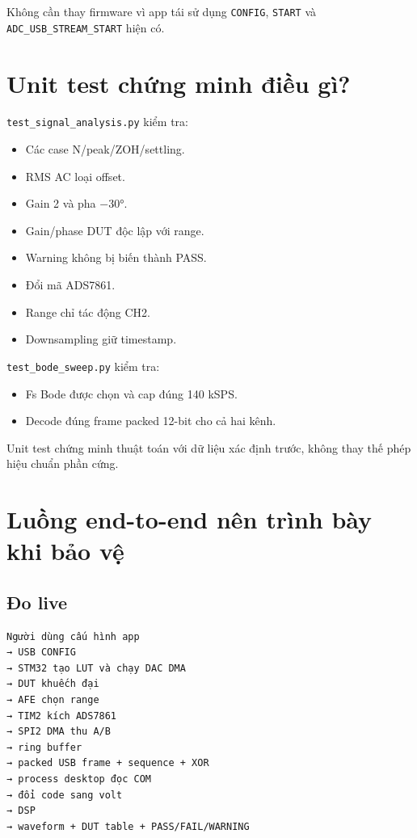\documentclass[12pt,a4paper,oneside]{article}
\newcommand{\inlinecode}[1]{\texttt{#1}}
\begin{document}
Không cần thay firmware vì app tái sử dụng \inlinecode{CONFIG}, \inlinecode{START} và \inlinecode{ADC\_USB\_STREAM\_START} hiện có.

\section{Unit test chứng minh điều gì?}

\inlinecode{test\_signal\_analysis.py} kiểm tra:

\begin{itemize}
\item Các case N/peak/ZOH/settling.
\item RMS AC loại offset.
\item Gain 2 và pha −30°.
\item Gain/phase DUT độc lập với range.
\item Warning không bị biến thành PASS.
\item Đổi mã ADS7861.
\item Range chỉ tác động CH2.
\item Downsampling giữ timestamp.
\end{itemize}

\inlinecode{test\_bode\_sweep.py} kiểm tra:

\begin{itemize}
\item Fs Bode được chọn và cap đúng 140 kSPS.
\item Decode đúng frame packed 12-bit cho cả hai kênh.
\end{itemize}

Unit test chứng minh thuật toán với dữ liệu xác định trước, không thay thế phép hiệu chuẩn phần cứng.

\section{Luồng end-to-end nên trình bày khi bảo vệ}

\subsection{Đo live}

\begin{Verbatim}[breaklines=true,breakanywhere=true,fontsize=\small]
Người dùng cấu hình app
→ USB CONFIG
→ STM32 tạo LUT và chạy DAC DMA
→ DUT khuếch đại
→ AFE chọn range
→ TIM2 kích ADS7861
→ SPI2 DMA thu A/B
→ ring buffer
→ packed USB frame + sequence + XOR
→ process desktop đọc COM
→ đổi code sang volt
→ DSP
→ waveform + DUT table + PASS/FAIL/WARNING
\end{Verbatim}
\end{document}
